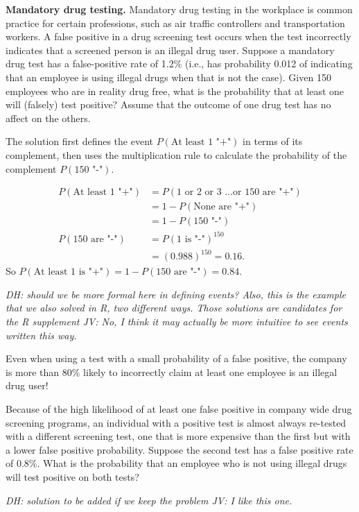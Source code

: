 \begin{example}{\textbf{Mandatory drug testing.} Mandatory drug testing in the workplace is common practice for certain professions, such as air traffic controllers and transportation workers.  A false positive in a drug screening test occurs when the test incorrectly indicates that a screened person is an illegal drug user. Suppose a mandatory drug test has a false-positive rate of 1.2\% (i.e., has probability  0.012 of indicating that an employee is using illegal drugs when that is not the case).  Given 150 employees who are in reality drug free, what is the probability that at least one will (falsely) test positive? Assume that the outcome of one drug test has no affect on the others.}

The solution first defines the event $P(\text{At least 1 "+"})$ in terms of its complement, then uses the multiplication rule to calculate the probability of the complement $P(\text{150 "-"})$.

   \begin{align*} 
   P(\text{At least 1 "+"}) &= P(\text{1 or 2 or 3 \ldots or 150 are "+"}) \\
           &= 1 - P(\text{None are "+"}) \\
           &= 1 - P(\text{150 "-"}) \\
 P(\text{150 are "-"}) &= P(\text{1 is "-"})^{150} \\
           &= (0.988)^{150} = 0.16.
    \end{align*}
   So $P(\text{At least 1 is "+"})  = 1 - P(\text{150 are "-"}) = 0.84.$
 
   \textit{DH: should we be more formal here in defining events? Also, this is the example that we also solved in R, two different ways.  Those solutions are candidates for the R supplement JV: No, I think it may actually be more intuitive to see events written this way.}

Even when using a test with a small probability of a false positive, the company is more than 80\% likely to incorrectly claim at least one employee is an illegal drug user!

\end{example}

\begin{exercise}
Because of the high likelihood of at least one false positive in company wide drug screening programs, an individual with a positive test is almost always re-tested with a different screening test, one that is more expensive than the first but with a lower false positive probability.  Suppose the second test has a false positive rate of 0.8\%.  What is the probability that an employee who is not using illegal drugs will test positive on both tests?

\textit{DH: solution to be added if we keep the problem JV: I like this one.}

\end{exercise}

